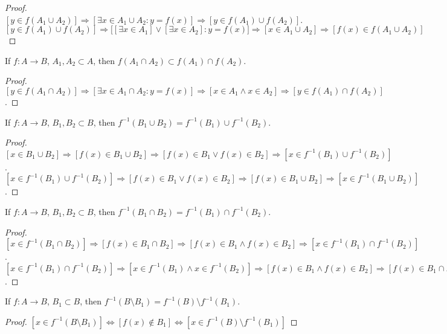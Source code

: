 \documentclass[crop=false,class=book,oneside]{standalone}
\begin{document}
        \begin{proof}
        $[y\in f(A_1\cup A_2)]\Rightarrow [\exists x\in A_1 \cup A_2:y=f(x)]\Rightarrow [y \in f(A_1)\cup f(A_2)]$. $[y\in f(A_1)\cup f(A_2)]\Rightarrow \big[[\exists x\in A_1] \lor [\exists x\in A_2]: y=f(x)\big]\Rightarrow [x\in A_1\cup A_2]\Rightarrow [f(x)\in f(A_1\cup A_2)]$
        \end{proof}
        \begin{theorem}
        If $f:A\rightarrow B$, $A_1,A_2\subset A$, then $f(A_1\cap A_2)\subset f(A_1)\cap f(A_2)$.
        \end{theorem}
        \begin{proof}
        $[y\in f(A_1 \cap A_2)]\Rightarrow [\exists x\in A_1 \cap A_2:y=f(x)]\Rightarrow [x\in A_1 \land x \in A_2] \Rightarrow[y \in f(A_1)\cap f(A_2)]$.
        \end{proof}
        \begin{theorem}
        If $f:A\rightarrow B$, $B_1,B_2\subset B$, then $f^{-1}(B_1\cup B_2) = f^{-1}(B_1)\cup f^{-1}(B_2)$.
        \end{theorem}
        \begin{proof}
        $[x\in B_1\cup B_2]\Rightarrow [f(x)\in B_1\cup B_2]\Rightarrow [f(x)\in B_1\lor f(x)\in B_2]\Rightarrow [x\in f^{-1}(B_1)\cup f^{-1}(B_2)]$. $[x \in f^{-1}(B_1)\cup f^{-1}(B_2)]\Rightarrow [f(x)\in B_1\lor f(x) \in B_2]\Rightarrow [f(x) \in B_1\cup B_2]\Rightarrow [x\in f^{-1}(B_1\cup B_2)]$.
        \end{proof}
        \begin{theorem}
        If $f:A\rightarrow B$, $B_1,B_2\subset B$, then $f^{-1}(B_1\cap B_2) = f^{-1}(B_1)\cap f^{-1}(B_2)$.
        \end{theorem}
        \begin{proof}
        $[x\in f^{-1}(B_1\cap B_2)]\Rightarrow [f(x) \in B_1 \cap B_2]\Rightarrow [f(x)\in B_1\land f(x) \in B_2 ]\Rightarrow [x\in f^{-1}(B_1)\cap f^{-1}(B_2)]$. $[x\in f^{-1}(B_1)\cap f^{-1}(B_2)]\Rightarrow [x\in f^{-1}(B_1)\land x\in f^{-1}(B_2)]\Rightarrow [f(x) \in B_1\land f(x) \in B_2]\Rightarrow [f(x)\in B_1\cap B_2]\Rightarrow [x\in f^{-1}(B_1\cap B_2)]$.
        \end{proof}
        \begin{theorem}
        If $f:A\rightarrow B$, $B_1 \subset B$, then $f^{-1}(B\setminus B_1) = f^{-1}(B)\setminus f^{-1}(B_1)$.
        \end{theorem}
        \begin{proof}
        $[x\in f^{-1}(B\setminus B_1)]\Leftrightarrow [f(x)\notin B_1]\Leftrightarrow [x\in f^{-1}(B)\setminus f^{-1}(B_1)]$
        \end{proof}
\end{document}
